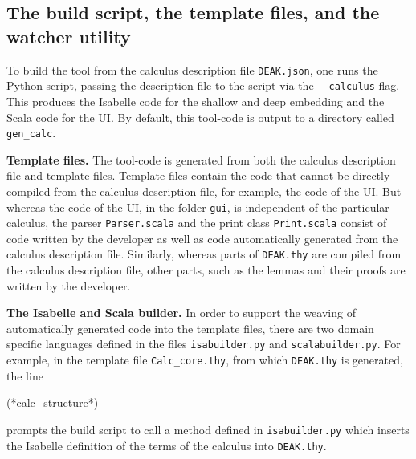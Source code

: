 \documentclass[runningheads,a4paper]{llncs}
\begin{document}
\subsection{The build script, the template files, and the watcher utility}
To build the tool from the calculus description file \texttt{DEAK.json}, one runs the Python script, passing the description file to the script via the \texttt{-{}-calculus} flag. This produces the Isabelle code for the shallow and deep embedding and the Scala code for the UI. By default, this tool-code is output to a directory called \texttt{gen\_calc}. 

\medskip\noindent\textbf{Template files. } The tool-code is generated from both the calculus description file and template files. Template files contain the code that cannot be directly compiled from the calculus description file, for example, the code of the UI. But whereas the code of the UI, in the folder
\texttt{gui}, is independent of the particular calculus, the parser \texttt{Parser.scala} and the print class \texttt{Print.scala} consist of code written by the developer as well as code automatically generated from the calculus description file. Similarly, whereas parts of \texttt{DEAK.thy} are compiled from the calculus description file, other parts, such as the lemmas and their proofs are written by the developer.


\medskip\noindent\textbf{The Isabelle and Scala builder. } In order to support the weaving of automatically generated code into the template files, there are two domain specific languages defined in the files \texttt{isabuilder.py} and \texttt{scalabuilder.py}. For example, in the template file \texttt{Calc\_core.thy}, from which \texttt{DEAK.thy} is generated, the line

\begin{pyglist}[language = isabelle]
(*calc_structure*)
\end{pyglist}

\noindent prompts the build script to call a method defined in \texttt{isabuilder.py} which inserts the Isabelle definition of the terms of the calculus into \texttt{DEAK.thy}.
\end{document}
